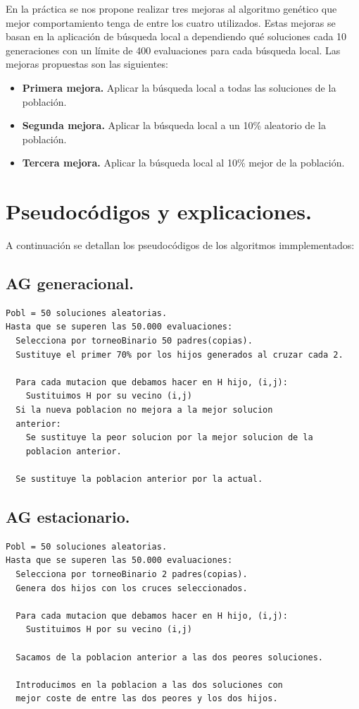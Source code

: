En la práctica se nos propone realizar tres mejoras al algoritmo genético que mejor comportamiento tenga de entre los cuatro utilizados. Estas mejoras se basan en la aplicación de búsqueda local a dependiendo qué soluciones cada 10 generaciones con un límite de 400 evaluaciones para cada búsqueda local. Las mejoras propuestas son las siguientes:
\begin{itemize}
	\item \textbf{Primera mejora.} Aplicar la búsqueda local a todas las soluciones de la población.
	\item \textbf{Segunda mejora.} Aplicar la búsqueda local a un 10\% aleatorio de la población.
	\item \textbf{Tercera mejora.} Aplicar la búsqueda local al 10\% mejor de la población.
\end{itemize}


\newpage
\section{Pseudocódigos y explicaciones.}

A continuación se detallan los pseudocódigos de los algoritmos immplementados:\\

\subsection{AG generacional.}

\begin{lstlisting}
Pobl = 50 soluciones aleatorias.
Hasta que se superen las 50.000 evaluaciones:
  Selecciona por torneoBinario 50 padres(copias).
  Sustituye el primer 70% por los hijos generados al cruzar cada 2.
  
  Para cada mutacion que debamos hacer en H hijo, (i,j):
    Sustituimos H por su vecino (i,j)
  Si la nueva poblacion no mejora a la mejor solucion
  anterior:
    Se sustituye la peor solucion por la mejor solucion de la
    poblacion anterior.
  
  Se sustituye la poblacion anterior por la actual.
\end{lstlisting}

\subsection{AG estacionario.}

\begin{lstlisting}
Pobl = 50 soluciones aleatorias.
Hasta que se superen las 50.000 evaluaciones:
  Selecciona por torneoBinario 2 padres(copias).
  Genera dos hijos con los cruces seleccionados.

  Para cada mutacion que debamos hacer en H hijo, (i,j):
    Sustituimos H por su vecino (i,j)

  Sacamos de la poblacion anterior a las dos peores soluciones.

  Introducimos en la poblacion a las dos soluciones con
  mejor coste de entre las dos peores y los dos hijos.
\end{lstlisting}

